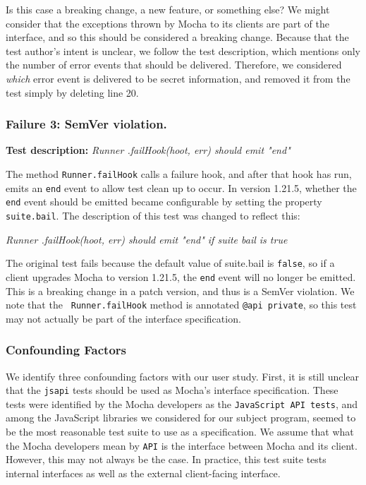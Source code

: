 Is this case a breaking change, a new feature, or something else?
We might consider that the exceptions thrown by Mocha to its clients
are part of the interface, and so this should be considered a breaking
change. Because that the test author's intent is unclear, we follow the
test description, which mentions only the number of error events that
should be delivered. Therefore, we considered {\em which} error event
is delivered to be secret information, and removed it from the test
simply by deleting line 20.

\subsubsection{Failure 3: SemVer violation.}
\label{sec:failure3}
{\bf Test description:}
%
{\em Runner .failHook(hoot, err) should emit "end" }

The method {\tt Runner.failHook} calls a failure hook, and after that
hook has run, emits an {\tt end} event to allow test clean up to occur. In
version 1.21.5, whether the {\tt end} event should be emitted became
configurable by setting the property {\tt suite.bail}. The
description of this test was changed to reflect this:

{\em Runner .failHook(hoot, err) should emit "end" if suite bail is
  true }

The original test fails because the default value of suite.bail is
{\tt false}, so if a client upgrades Mocha to version 1.21.5, the
{\tt end} event will no longer be emitted. This is a breaking change in
a patch version, and thus is a SemVer violation. We note that the {\tt
  Runner.failHook} method is annotated {\tt @api private}, so this test
may not actually be part of the interface specification.

\subsubsection{Confounding Factors}
We identify three confounding factors with our user study. First, it
is still unclear that the {\tt jsapi} tests should be used as Mocha's
interface specification. These tests were identified by the Mocha
developers as the {\tt JavaScript API tests}, and among the JavaScript
libraries we considered for our subject program, seemed to be the most
reasonable test suite to use as a specification. We assume that what
the Mocha developers mean by {\tt API} is the interface between Mocha and
its client. However, this may not always be the case. In practice, this
test suite tests internal interfaces as well as the external
client-facing interface.

